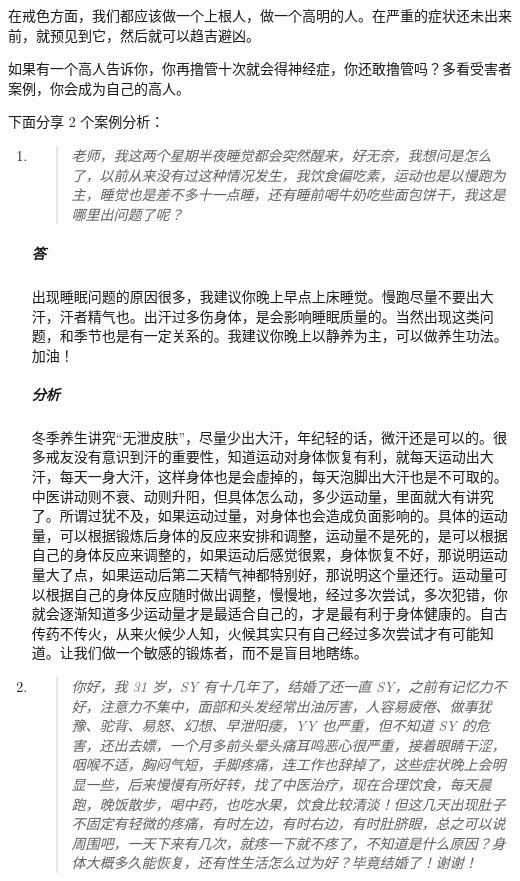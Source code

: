 \documentclass{ctexart}
\begin{document}
在戒色方面，我们都应该做一个上根人，做一个高明的人。在严重的症状还未出来前，就预见到它，然后就可以趋吉避凶。

如果有一个高人告诉你，你再撸管十次就会得神经症，你还敢撸管吗？多看受害者案例，你会成为自己的高人。

下面分享 2 个案例分析：

\begin{enumerate}
    \item \begin{quote}\it
        老师，我这两个星期半夜睡觉都会突然醒来，好无奈，我想问是怎么了，以前从来没有过这种情况发生，我饮食偏吃素，运动也是以慢跑为主，睡觉也是差不多十一点睡，还有睡前喝牛奶吃些面包饼干，我这是哪里出问题了呢？
    \end{quote}
    \subparagraph{答} 出现睡眠问题的原因很多，我建议你晚上早点上床睡觉。慢跑尽量不要出大汗，汗者精气也。出汗过多伤身体，是会影响睡眠质量的。当然出现这类问题，和季节也是有一定关系的。我建议你晚上以静养为主，可以做养生功法。加油！
    \subparagraph{分析} 冬季养生讲究“无泄皮肤”，尽量少出大汗，年纪轻的话，微汗还是可以的。很多戒友没有意识到汗的重要性，知道运动对身体恢复有利，就每天运动出大汗，每天一身大汗，这样身体也是会虚掉的，每天泡脚出大汗也是不可取的。中医讲动则不衰、动则升阳，但具体怎么动，多少运动量，里面就大有讲究了。所谓过犹不及，如果运动过量，对身体也会造成负面影响的。具体的运动量，可以根据锻炼后身体的反应来安排和调整，运动量不是死的，是可以根据自己的身体反应来调整的，如果运动后感觉很累，身体恢复不好，那说明运动量大了点，如果运动后第二天精气神都特别好，那说明这个量还行。运动量可以根据自己的身体反应随时做出调整，慢慢地，经过多次尝试，多次犯错，你就会逐渐知道多少运动量才是最适合自己的，才是最有利于身体健康的。自古传药不传火，从来火候少人知，火候其实只有自己经过多次尝试才有可能知道。让我们做一个敏感的锻炼者，而不是盲目地瞎练。
    \item \begin{quote}\it
        你好，我 31 岁，SY 有十几年了，结婚了还一直 SY，之前有记忆力不好，注意力不集中，面部和头发经常出油厉害，人容易疲倦、做事犹豫、驼背、易怒、幻想、早泄阳痿，YY 也严重，但不知道 SY 的危害，还出去嫖，一个月多前头晕头痛耳鸣恶心很严重，接着眼睛干涩，咽喉不适，胸闷气短，手脚疼痛，连工作也辞掉了，这些症状晚上会明显一些，后来慢慢有所好转，找了中医治疗，现在合理饮食，每天晨跑，晚饭散步，喝中药，也吃水果，饮食比较清淡！但这几天出现肚子不固定有轻微的疼痛，有时左边，有时右边，有时肚脐眼，总之可以说周围吧，一天下来有几次，就疼一下就不疼了，不知道是什么原因？身体大概多久能恢复，还有性生活怎么过为好？毕竟结婚了！谢谢！
    \end{quote}

\end{enumerate}
\end{document}
